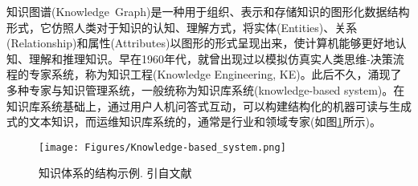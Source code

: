 知识图谱\textrm{(Knowledge~Graph)}是一种用于组织、表示和存储知识的图形化数据结构形式，它仿照人类对于知识的认知、理解方式，将实体\textrm{(Entities)}、关系\textrm{(Relationship)}和属性\textrm{(Attributes)}以图形的形式呈现出来，使计算机能够更好地认知、理解和推理知识。早在1960年代，就曾出现过以模拟仿真实人类思维-决策流程的专家系统，称为知识工程\textrm{(Knowledge Engineering, KE)}。此后不久，涌现了多种专家与知识管理系统，一般统称为知识库系统\textrm{(knowledge-based system)}。在知识库系统基础上，通过用户人机问答式互动，可以构建结构化的机器可读与生成式的文本知识，而运维知识库系统的，通常是行业和领域专家(如图\ref{Fig:Knowledge-based_system}所示)。
\begin{figure}[h!]
\centering
\texttt{[image: Figures/Knowledge-based\_system.png]}
\caption{\small\textrm{知识体系的结构示例. 引自文献~\cite{ACR56-128_2023}}}%
\label{Fig:Knowledge-based_system}
\end{figure}

